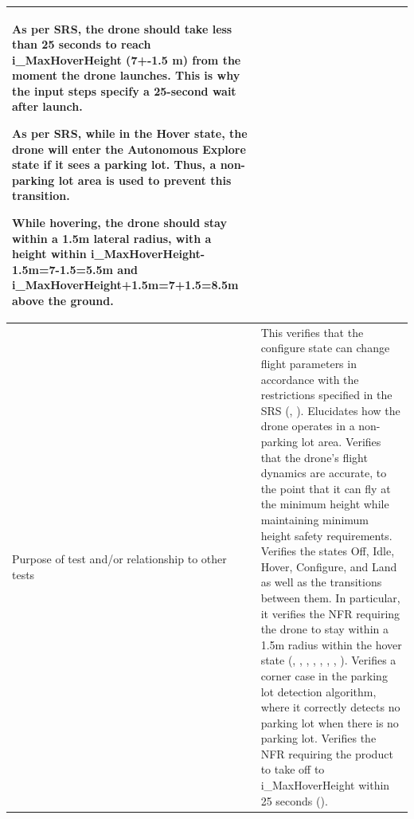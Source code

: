 \documentclass[12pt, titlepage]{article}
\begin{document}
\begin{table}[!h]
\begin{center}
\begin{tabular}{ | m{1.5cm} | m{15cm} | }
As per SRS, the drone should take less than 25 seconds to reach i\_MaxHoverHeight (7+-1.5 m) from the moment the drone launches. This is why the input steps specify a 25-second wait after launch.

As per SRS, while in the Hover state, the drone will enter the Autonomous Explore state if it sees a parking lot. Thus, a non-parking lot area is used to prevent this transition.

While hovering, the drone should stay within a 1.5m lateral radius, with a height within i\_MaxHoverHeight-1.5m=7-1.5=5.5m and i\_MaxHoverHeight+1.5m=7+1.5=8.5m above the ground.  
\\ 
\hline
Purpose of test and/or relationship to other tests & This verifies that the configure state can change flight parameters in accordance with the restrictions specified in the SRS (\nameref{GEN_003}, \nameref{GEN_004}).
Elucidates how the drone operates in a non-parking lot area.
Verifies that the drone's flight dynamics are accurate, to the point that it can fly at the minimum height while maintaining minimum height safety requirements.
Verifies the states Off, Idle, Hover, Configure, and Land as well as the transitions between them. In particular, it verifies the NFR requiring the drone to stay within a 1.5m radius within the hover state (\nameref{STA_000}, \nameref{STA_001}, \nameref{STA_004}, \nameref{STA_005}, \nameref{STA_006}, \nameref{TRANS_002}, \nameref{TRANS_003}, \nameref{TRANS_009}).
Verifies a corner case in the parking lot detection algorithm, where it correctly detects no parking lot when there is no parking lot.
Verifies the NFR requiring the product to take off to i\_MaxHoverHeight within 25 seconds (\nameref{PERF_002}). \\ 
\hline
\end{tabular}
\end{center}
\end{table}
\end{document}
